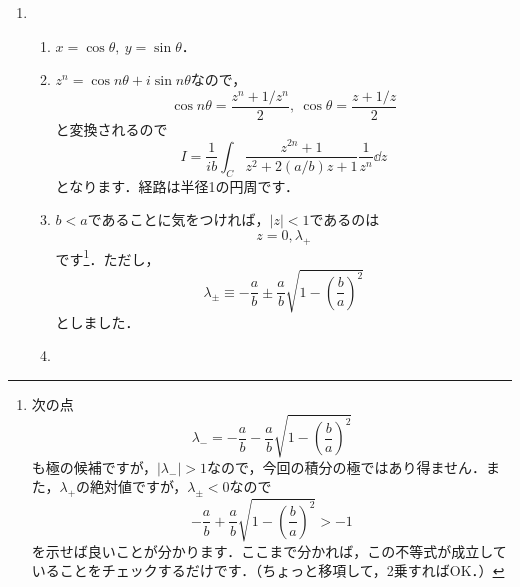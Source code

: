 \documentclass[a4paper,pdflatex,ja=standard]{bxjsarticle}
\begin{document}
\begin{enumerate}

  \item 

  \begin{enumerate}
    \item 

    $x=\cos\theta,\ y=\sin\theta$．

    
    \item 

    $z^{n}=\cos n\theta+i\sin n\theta$なので，
    \begin{equation}
      \cos n\theta
      =
      \frac{z^n + 1/z^{n}}{2}
      ,\ 
      \cos\theta
      =
      \frac{z+1/z}{2}
    \end{equation}
    と変換されるので
    \begin{equation}
      I
      =
      \frac{1}{ib}
      \int_{C}
      \frac{z^{2n}+1}{z^2+2(a/b)z+1}\frac{1}{z^n}\dd z
    \end{equation}
    となります．経路は半径1の円周です．


    \item 

    $b<a$であることに気をつければ，$|z|<1$であるのは
    \begin{equation}
      z
      =
      0
      ,
      \lambda_{+}
    \end{equation}
    です\footnote{
      次の点
      $$
        \lambda_{-}
        =
        -\frac{a}{b}
        -
        \frac{a}{b}
        \sqrt{
          1-\left( \frac{b}{a} \right)^2
        }
      $$
      も極の候補ですが，$|\lambda_{-}|>1$なので，今回の積分の極ではあり得ません．また，$\lambda_{+}$の絶対値ですが，$\lambda_{\pm}<0$なので
      $$
        -\frac{a}{b}
        +
        \frac{a}{b}
        \sqrt{
          1-\left( \frac{b}{a} \right)^2
        }
        >
        -1        
      $$
      を示せば良いことが分かります．ここまで分かれば，この不等式が成立していることをチェックするだけです．（ちょっと移項して，2乗すればOK．）
    }．ただし，
    \begin{equation}
      \lambda_{\pm}
      \equiv
      -\frac{a}{b}
      \pm
      \frac{a}{b}
      \sqrt{
        1-\left( \frac{b}{a} \right)^2
      }      
    \end{equation}
    としました．


    \item 


\end{enumerate}
\end{enumerate}
\end{document}
